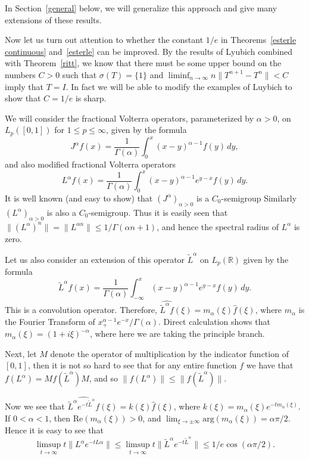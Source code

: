 \documentclass[12pt]{amsart}
\newcommand{\R}{{\mathbb R}}
\newcommand{\snormo}[1]{{\mathopen\|#1\mathclose\|}}
\begin{document}
In Section~\ref{general} below, we will generalize this approach
and give many extensions of these results.

Now let us turn out attention to whether the constant $1/e$ in
Theorems~\ref{esterle continuous} and~\ref{esterle} can be
improved. By the results of Lyubich \cite{lyubich2} combined with
Theorem~\ref{ritt}, we know that there must be some upper bound on
the numbers $C>0$ such that $\sigma(T) = \{1\}$ and
$\liminf_{n\to\infty} n \snormo{T^{n+1}-T^n} < C$ imply that
$T=I$. In fact we will be able to modify the examples of Luybich
to show that $C = 1/e$ is sharp.

We will consider the fractional Volterra operators, parameterized
by $\alpha>0$, on $L_p([0,1])$ for $1 \le p \le \infty$, given by the
formula
$$ J^\alpha f(x) = \frac1{\Gamma(\alpha)}\int_0^x (x-y)^{\alpha-1}
   f(y) \, dy ,$$
and also modified fractional Volterra operators
$$ L^\alpha f(x) = \frac1{\Gamma(\alpha)}\int_0^x (x-y)^{\alpha-1}
   e^{y-x} f(y) \, dy .$$
It is well known (and easy to show)
that $(J^\alpha)_{\alpha>0}$ is a $C_0$-semigroup
Similarly $(L^\alpha)_{\alpha>0}$ is also a $C_0$-semigroup.
Thus it is easily seen that $\snormo{(L^\alpha)^n} = \snormo{L^{\alpha n}}
\le 1/\Gamma(\alpha n +1)$, and hence the spectral radius of $L^\alpha$
is zero.

Let us also consider an extension of this operator $\tilde L^\alpha$
on $L_p(\R)$ given by the formula
$$ \tilde L^\alpha f(x)
   = \frac1{\Gamma(\alpha)}\int_{-\infty}^x (x-y)^{\alpha-1}
   e^{y-x} f(y) \, dy .$$
This is a convolution operator.  Therefore,
$\widehat{\tilde L^\alpha f}(\xi) = m_\alpha(\xi) \hat f(\xi)$,
where $m_\alpha$ is the Fourier Transform of $x_+^{\alpha-1} e^{-x}
/\Gamma(\alpha)$.  Direct calculation shows that
$m_\alpha(\xi) = (1+i\xi)^{-\alpha}$,
where here we are taking the principle
branch.

Next,
let $M$ denote the operator of
multiplication by the indicator function of $[0,1]$, then
it is not so hard to see that for any entire function
$f$ we have that $f(L^\alpha) = M f(\tilde L^\alpha) M$, and so
$\snormo{f(L^\alpha)} \le \snormo{f(\tilde L^\alpha)}$.

Now we see that
$\widehat{\tilde L^\alpha e^{-t\tilde L^\alpha}f}(\xi) = k(\xi) \hat f(\xi)$,
where $k(\xi) = m_\alpha(\xi) e^{-t m_\alpha(\xi)}$.  If $0<\alpha<1$, then
$\text{Re}(m_\alpha(\xi)) > 0$, and
$\lim_{\xi\to\pm\infty} \text{arg}(m_\alpha(\xi)) = \alpha\pi/2$.  Hence
it is easy to see that
$$ \limsup_{t\to\infty} t\snormo{L^\alpha e^{-t L \alpha}} \le
\limsup_{t\to\infty} t\snormo{\tilde L^\alpha e^{-t\tilde L^\alpha}} \le
1/e \cos(\alpha \pi/2) .$$
\end{document}
